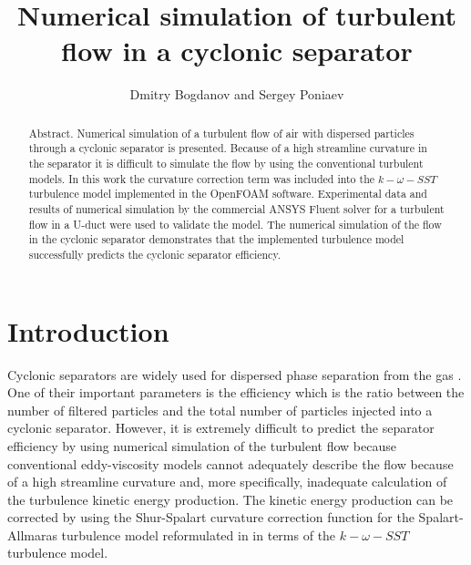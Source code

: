 \documentclass[a4paper]{jpconf}
\begin{document}

\title{Numerical simulation of turbulent flow in a cyclonic separator}

\author{Dmitry Bogdanov and Sergey Poniaev}

\address{Division of Plasma Physics, Atomic Physics and Astrophysics, Ioffe Physical Technical Institute, 26 Polytekhnicheskaya, St Petersburg 194021, Russian Federation}


\begin{abstract}
Abstract. Numerical simulation of a turbulent flow of air with dispersed particles through 
a cyclonic separator is presented. Because of a high streamline curvature in the separator it 
is difficult to simulate the flow by using the conventional turbulent models. In this work the 
curvature correction term was included into the $k-\omega-SST$ turbulence model implemented in 
the OpenFOAM{\textregistered} software. Experimental data and results of numerical simulation by the
commercial ANSYS Fluent{\textregistered} solver for a turbulent flow in a U-duct were used to validate the 
model. The numerical simulation of the flow in the cyclonic separator demonstrates that the 
implemented turbulence model successfully predicts the cyclonic separator efficiency.
\end{abstract}

\section{Introduction}
Cyclonic separators are widely used for dispersed phase separation from the gas \cite{instructions} . One of 
their important parameters is the efficiency which is the ratio between the number of filtered 
particles and the total number of particles injected into a cyclonic separator. However, it is 
extremely difficult to predict the separator efficiency by using numerical simulation of the 
turbulent flow because conventional eddy-viscosity models cannot adequately describe the 
flow \cite{ShurSpallart} because of a high streamline curvature and, more specifically, inadequate calculation 
of the turbulence kinetic energy production. The kinetic energy production can be corrected by 
using the Shur-Spalart curvature correction function for the Spalart-Allmaras turbulence model 
reformulated in \cite{Smirnov} in terms of the $k-\omega-SST$ turbulence model.
\end{document}
